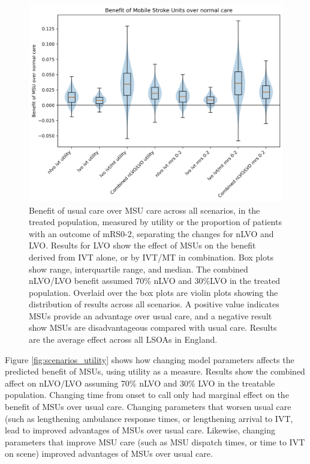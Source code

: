 \begin{figure}[h]
    \centering
    \includegraphics[width=0.6\linewidth]{images/scenario_results_summary.png}
    \caption{Benefit of usual care over MSU care across all scenarios, in the treated population, measured by utility or the proportion of patients with an outcome of mRS0-2, separating the changes for nLVO and LVO. Results for LVO show the effect of MSUs on the benefit derived from IVT alone, or by IVT/MT in combination. Box plots show range, interquartile range, and median. The combined nLVO/LVO benefit assumed 70\% nLVO and 30\%LVO in the treated population. Overlaid over the box plots are violin plots showing the distribution of results across all scenarios. A positive value indicates MSUs provide an advantage over usual care, and a negative result show MSUs are disadvantageous compared with usual care. Results are the average effect across all LSOAs in England.}
    \label{fig:scenarios_overview}
\end{figure}



Figure \ref{fig:scenarios_utility} shows how changing model parameters affects the predicted benefit of MSUs, using utility as a measure. Results show the combined affect on nLVO/LVO assuming 70\% nLVO and 30\% LVO  in the treatable population. Changing time from onset to call only had marginal effect on the benefit of MSUs over usual care. Changing parameters that worsen usual care (such as lengthening ambulance response times, or lengthening arrival to IVT, lead to improved advantages of MSUs over usual care. Likewise, changing parameters that improve MSU care (such as MSU dispatch times, or time to IVT on scene) improved advantages of MSUs over usual care.

